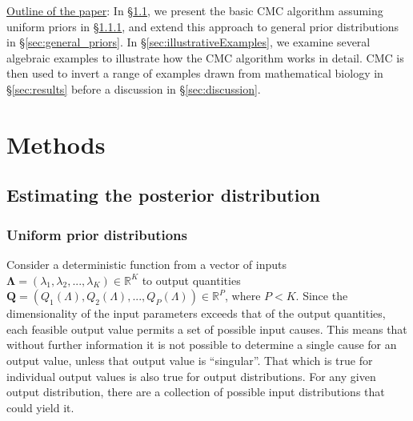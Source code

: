 \documentclass[10pt,letterpaper]{article}
\newcommand{\R}{\mathbb{R}}
\begin{document}
\bigskip
\noindent\underline{Outline of the paper}: In \S \ref{sec:methods}, we present the basic CMC algorithm assuming uniform priors in \S \ref{sec:uniform_priors}, and extend this approach to general prior distributions in \S \ref{sec:general_priors}. In \S \ref{sec:illustrativeExamples}, we examine several algebraic examples to illustrate how the CMC algorithm works in detail. CMC is then used to invert a range of examples drawn from mathematical biology in \S \ref{sec:results} before a discussion in \S \ref{sec:discussion}.

\section{Methods}

\subsection{Estimating the posterior distribution}
\label{sec:methods}

\subsubsection{Uniform prior distributions}
\label{sec:uniform_priors}

Consider a deterministic function from a vector of inputs $\boldsymbol{\Lambda} = (\lambda_1, \lambda_2, ..., \lambda_K) \in \R^K$ to output quantities $\boldsymbol{Q} = \left(Q_1(\Lambda), Q_2(\Lambda), ..., Q_P(\Lambda) \right) \in \R^P$, where $P<K$. Since the dimensionality of the input parameters exceeds that of the output quantities, each feasible output value permits a set of possible input causes. This means that without further information it is not possible to determine a single cause for an output value, unless that output value is ``singular''. That which is true for individual output values is also true for output distributions. For any given output distribution, there are a collection of possible input distributions that could yield it.
\end{document}
